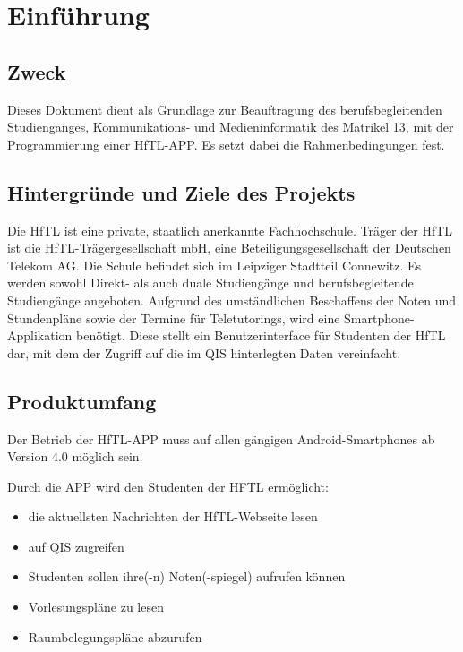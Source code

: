 
\section{Einführung}

\subsection{\textbf{Zweck}}
Dieses Dokument dient als Grundlage zur Beauftragung des berufsbegleitenden Studienganges, Kommunikations- und Medieninformatik des Matrikel 13, mit der Programmierung einer \acs{HfTL}-\acs{APP}. Es setzt dabei die Rahmenbedingungen fest.

\subsection{\textbf{Hintergründe und Ziele des Projekts}}
Die \acf{HfTL} ist eine private, staatlich anerkannte Fachhochschule. Träger der \ac{HfTL} ist die \ac{HfTL}-Trägergesellschaft \acs{mbH}, eine Beteiligungsgesellschaft der Deutschen Telekom AG. Die Schule befindet sich im Leipziger Stadtteil Connewitz. Es werden sowohl Direkt- als auch duale Studiengänge und berufsbegleitende Studiengänge angeboten.
Aufgrund des umständlichen Beschaffens der Noten und Stundenpläne sowie der Termine für Teletutorings, wird eine Smartphone-Applikation benötigt. Diese stellt ein Benutzerinterface für Studenten der \acs{HfTL} dar, mit dem der Zugriff auf die im \acs{QIS} hinterlegten Daten vereinfacht.

\subsection{\textbf{Produktumfang}}

Der Betrieb der \acs{HfTL}-APP muss auf allen gängigen Android-Smartphones ab Version 4.0 möglich sein.

Durch die APP wird den Studenten der HFTL ermöglicht: 

\begin{itemize}
      \item die aktuellsten Nachrichten der \acs{HfTL}-Webseite lesen
      \item auf \acs{QIS} zugreifen
      \item Studenten sollen ihre(-n) Noten(-spiegel) aufrufen können
      \item Vorlesungspläne zu lesen
      \item Raumbelegungspläne abzurufen
\end{itemize}
   
